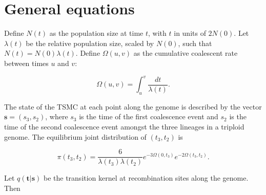 \documentclass{article}
\begin{document}
\section{General equations}

Define $N(t)$ as the population size at time $t$, with $t$ in units of $2N(0)$.
Let $\lambda(t)$ be the relative population size, scaled by $N(0)$, such that
$N(t) = N(0)\lambda(t)$. Define $\Omega(u,v)$ as the cumulative coalescent rate
between times $u$ and $v$:

\begin{equation}
    \Omega(u,v) = \int_u^v \frac{dt}{\lambda(t)}.
\end{equation}

The state of the TSMC at each point along the genome is described by the vector
$\boldsymbol{s} = (s_3,s_2)$, where $s_3$ is the time of the first coalescence
event and $s_2$ is the time of the second coalescence event amongst the three
lineages in a triploid genome. The equilibrium joint distribution of
$(t_3,t_2)$ is

\begin{equation}
    \pi(t_3,t_2) = \frac{6}{\lambda(t_3)\lambda(t_2)}e^{-3\Omega(0,t_3)}e^{-2\Omega(t_3,t_2)}.
    \label{eq:equilibriumjointdistn}
\end{equation}

Let $q(\boldsymbol{t}|\boldsymbol{s})$ be the transition kernel at
recombination sites along the genome. Then
\end{document}
